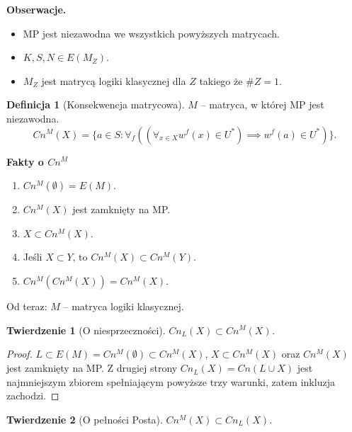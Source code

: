 \documentclass[10pt,a4paper]{article}
\theoremstyle{plain}
\newtheorem{theorem}{Twierdzenie}
\theoremstyle{definition}
\newtheorem*{definition}{Definicja}
\newcommand{\header}[1]{\noindent\textbf{#1}}
\begin{document}
\header{Obserwacje.} 

\begin{itemize}
  \item MP jest niezawodna we wszystkich powyższych matrycach.
  \item $K,S,N \in E(M_Z)$.
  \item $M_Z$ jest matrycą logiki klasycznej dla $Z$ takiego że $\#Z=1$.
\end{itemize}

\begin{definition}[Konsekwencja matrycowa]
$M$ -- matryca, w której MP jest niezawodna.
$$Cn^M(X) = \{ a \in S : \forall_f 
  ((\forall_{x \in X} w^f(x) \in U^*) \implies w^f(a) \in U^*) \}.$$
\end{definition}

\header{Fakty o $Cn^M$}

\begin{enumerate}
  \item $Cn^M(\emptyset) = E(M)$.
  \item $Cn^M(X)$ jest zamknięty na MP.
  \item $X \subset Cn^M(X)$.
  \item Jeśli $X \subset Y$, to $Cn^M(X) \subset Cn^M(Y)$.
  \item $Cn^M(Cn^M(X)) = Cn^M(X)$.
\end{enumerate}

\noindent Od teraz: $M$ -- matryca logiki klasycznej.

\begin{theorem}[O niesprzeczności]
$Cn_L(X) \subset Cn^M(X)$.
\end{theorem}

\begin{proof}
$L \subset E(M) = Cn^M(\emptyset) \subset Cn^M(X)$, $X \subset Cn^M(X)$
oraz $Cn^M(X)$ jest zamknięty na MP. Z drugiej strony
$Cn_L(X) = Cn(L \cup X)$ jest najmniejszym zbiorem spełniającym powyższe
trzy warunki, zatem inkluzja zachodzi.
\end{proof}

\begin{theorem}[O pełności Posta]
$Cn^M(X) \subset Cn_L(X)$.
\end{theorem}

\end{document}
